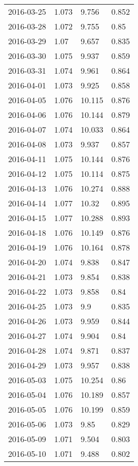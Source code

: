 \begin{center}
\begin{longtable}{r lll}
    2016-03-25 & 1.073  & 9.756  & 0.852  \\
    2016-03-28 & 1.072  & 9.755  & 0.85   \\
    2016-03-29 & 1.07   & 9.657  & 0.835  \\
    2016-03-30 & 1.075  & 9.937  & 0.859  \\
    2016-03-31 & 1.074  & 9.961  & 0.864  \\
    2016-04-01 & 1.073  & 9.925  & 0.858  \\
    2016-04-05 & 1.076  & 10.115 & 0.876  \\
    2016-04-06 & 1.076  & 10.144 & 0.879  \\
    2016-04-07 & 1.074  & 10.033 & 0.864  \\
    2016-04-08 & 1.073  & 9.937  & 0.857  \\
    2016-04-11 & 1.075  & 10.144 & 0.876  \\
    2016-04-12 & 1.075  & 10.114 & 0.875  \\
    2016-04-13 & 1.076  & 10.274 & 0.888  \\
    2016-04-14 & 1.077  & 10.32  & 0.895  \\
    2016-04-15 & 1.077  & 10.288 & 0.893  \\
    2016-04-18 & 1.076  & 10.149 & 0.876  \\
    2016-04-19 & 1.076  & 10.164 & 0.878  \\
    2016-04-20 & 1.074  & 9.838  & 0.847  \\
    2016-04-21 & 1.073  & 9.854  & 0.838  \\
    2016-04-22 & 1.073  & 9.858  & 0.84   \\
    2016-04-25 & 1.073  & 9.9    & 0.835  \\
    2016-04-26 & 1.073  & 9.959  & 0.844  \\
    2016-04-27 & 1.074  & 9.904  & 0.84   \\
    2016-04-28 & 1.074  & 9.871  & 0.837  \\
    2016-04-29 & 1.073  & 9.957  & 0.838  \\
    2016-05-03 & 1.075  & 10.254 & 0.86   \\
    2016-05-04 & 1.076  & 10.189 & 0.857  \\
    2016-05-05 & 1.076  & 10.199 & 0.859  \\
    2016-05-06 & 1.073  & 9.85   & 0.829  \\
    2016-05-09 & 1.071  & 9.504  & 0.803  \\
    2016-05-10 & 1.071  & 9.488  & 0.802  \\

\end{longtable}
\end{center}
